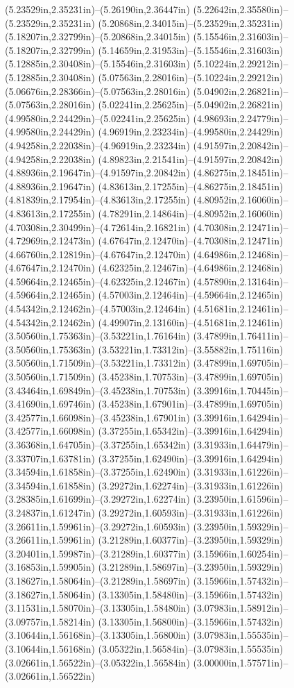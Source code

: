 (5.23529in,2.35231in)--(5.26190in,2.36447in) (5.22642in,2.35580in)--(5.23529in,2.35231in) (5.20868in,2.34015in)--(5.23529in,2.35231in) (5.18207in,2.32799in)--(5.20868in,2.34015in) (5.15546in,2.31603in)--(5.18207in,2.32799in) (5.14659in,2.31953in)--(5.15546in,2.31603in) (5.12885in,2.30408in)--(5.15546in,2.31603in) (5.10224in,2.29212in)--(5.12885in,2.30408in) (5.07563in,2.28016in)--(5.10224in,2.29212in) (5.06676in,2.28366in)--(5.07563in,2.28016in) (5.04902in,2.26821in)--(5.07563in,2.28016in) (5.02241in,2.25625in)--(5.04902in,2.26821in) (4.99580in,2.24429in)--(5.02241in,2.25625in) (4.98693in,2.24779in)--(4.99580in,2.24429in) (4.96919in,2.23234in)--(4.99580in,2.24429in) (4.94258in,2.22038in)--(4.96919in,2.23234in) (4.91597in,2.20842in)--(4.94258in,2.22038in) (4.89823in,2.21541in)--(4.91597in,2.20842in) (4.88936in,2.19647in)--(4.91597in,2.20842in) (4.86275in,2.18451in)--(4.88936in,2.19647in) (4.83613in,2.17255in)--(4.86275in,2.18451in) (4.81839in,2.17954in)--(4.83613in,2.17255in) (4.80952in,2.16060in)--(4.83613in,2.17255in) (4.78291in,2.14864in)--(4.80952in,2.16060in) (4.70308in,2.30499in)--(4.72614in,2.16821in) (4.70308in,2.12471in)--(4.72969in,2.12473in) (4.67647in,2.12470in)--(4.70308in,2.12471in) (4.66760in,2.12819in)--(4.67647in,2.12470in) (4.64986in,2.12468in)--(4.67647in,2.12470in) (4.62325in,2.12467in)--(4.64986in,2.12468in) (4.59664in,2.12465in)--(4.62325in,2.12467in) (4.57890in,2.13164in)--(4.59664in,2.12465in) (4.57003in,2.12464in)--(4.59664in,2.12465in) (4.54342in,2.12462in)--(4.57003in,2.12464in) (4.51681in,2.12461in)--(4.54342in,2.12462in) (4.49907in,2.13160in)--(4.51681in,2.12461in) (3.50560in,1.75363in)--(3.53221in,1.76164in) (3.47899in,1.76411in)--(3.50560in,1.75363in) (3.53221in,1.73312in)--(3.55882in,1.75116in) (3.50560in,1.71509in)--(3.53221in,1.73312in) (3.47899in,1.69705in)--(3.50560in,1.71509in) (3.45238in,1.70753in)--(3.47899in,1.69705in) (3.43464in,1.69849in)--(3.45238in,1.70753in) (3.39916in,1.70445in)--(3.41690in,1.69746in) (3.45238in,1.67901in)--(3.47899in,1.69705in) (3.42577in,1.66098in)--(3.45238in,1.67901in) (3.39916in,1.64294in)--(3.42577in,1.66098in) (3.37255in,1.65342in)--(3.39916in,1.64294in) (3.36368in,1.64705in)--(3.37255in,1.65342in) (3.31933in,1.64479in)--(3.33707in,1.63781in) (3.37255in,1.62490in)--(3.39916in,1.64294in) (3.34594in,1.61858in)--(3.37255in,1.62490in) (3.31933in,1.61226in)--(3.34594in,1.61858in) (3.29272in,1.62274in)--(3.31933in,1.61226in) (3.28385in,1.61699in)--(3.29272in,1.62274in) (3.23950in,1.61596in)--(3.24837in,1.61247in) (3.29272in,1.60593in)--(3.31933in,1.61226in) (3.26611in,1.59961in)--(3.29272in,1.60593in) (3.23950in,1.59329in)--(3.26611in,1.59961in) (3.21289in,1.60377in)--(3.23950in,1.59329in) (3.20401in,1.59987in)--(3.21289in,1.60377in) (3.15966in,1.60254in)--(3.16853in,1.59905in) (3.21289in,1.58697in)--(3.23950in,1.59329in) (3.18627in,1.58064in)--(3.21289in,1.58697in) (3.15966in,1.57432in)--(3.18627in,1.58064in) (3.13305in,1.58480in)--(3.15966in,1.57432in) (3.11531in,1.58070in)--(3.13305in,1.58480in) (3.07983in,1.58912in)--(3.09757in,1.58214in) (3.13305in,1.56800in)--(3.15966in,1.57432in) (3.10644in,1.56168in)--(3.13305in,1.56800in) (3.07983in,1.55535in)--(3.10644in,1.56168in) (3.05322in,1.56584in)--(3.07983in,1.55535in) (3.02661in,1.56522in)--(3.05322in,1.56584in) (3.00000in,1.57571in)--(3.02661in,1.56522in) 
